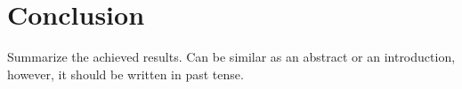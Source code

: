 
\chapter{Conclusion\label{chap:conclusion}}

Summarize the achieved results.
Can be similar as an abstract or an introduction, however, it should be written in past tense.

